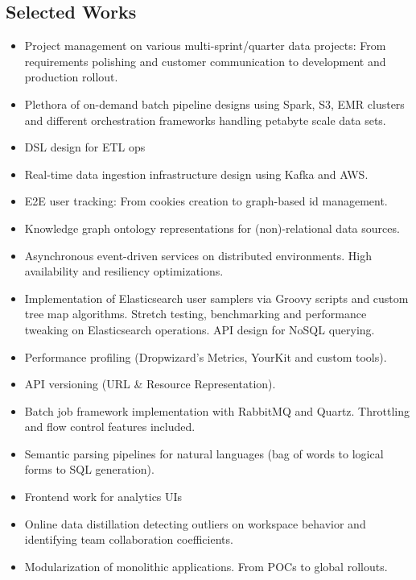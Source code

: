 \documentclass{article}
\begin{document}
	\vspace{+0.5cm}
	\begin{multicols}{2}
	
		\section*{\color{NavyBlue}Selected Works}
		\vspace{-0.5cm}
		{\color{NavyBlue}\hrulefill}
			\begin{itemize}
                    \item Project management on various multi-sprint/quarter data projects: From requirements polishing and customer communication to development and production rollout. 
				\item Plethora of on-demand batch pipeline designs using Spark, S3, EMR clusters and different orchestration frameworks handling petabyte scale data sets.
				\item DSL design for ETL ops
				\item Real-time data ingestion infrastructure design using Kafka and AWS.
				\item E2E user tracking: From cookies creation to graph-based id management.
				\item Knowledge graph ontology representations for (non)-relational data sources.
				\item Asynchronous event-driven services on distributed environments. High availability and resiliency optimizations.
				\item Implementation of Elasticsearch user samplers via Groovy scripts and custom tree map algorithms. Stretch testing, benchmarking and performance tweaking on Elasticsearch operations. API design for NoSQL querying.
				\item Performance profiling (Dropwizard’s Metrics, YourKit and custom tools).
				\item API versioning (URL \& Resource Representation).
				\item Batch job framework implementation with RabbitMQ and Quartz. Throttling and flow control features included.
				\item Semantic parsing pipelines for natural languages (bag of words to logical forms to SQL generation).
				\item Frontend work for analytics UIs
				\item Online data distillation detecting outliers on workspace behavior and identifying team collaboration coefficients.
				\item Modularization of monolithic applications. From POCs to global rollouts.

\end{itemize}
\end{multicols}
\end{document}
